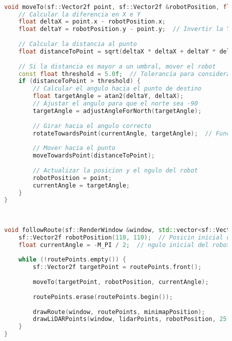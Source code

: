 \begin{lstlisting}[language={C++}, caption={Primer ajuste de c\'odigo}, label={Script}]
        
        
        
        void moveTo(sf::Vector2f point, sf::Vector2f &robotPosition, float &currentAngle) {
            // Calcular la diferencia en X e Y
            float deltaX = point.x - robotPosition.x;
            float deltaY = robotPosition.y - point.y;  // Invertir la Y para la pantalla
        
            // Calcular la distancia al punto
            float distanceToPoint = sqrt(deltaX * deltaX + deltaY * deltaY);
        
            // Si la distancia es mayor a un umbral, mover el robot
            const float threshold = 5.0f;  // Tolerancia para considerar que el punto ha sido alcanzado
            if (distanceToPoint > threshold) {
                // Calcular el angulo hacia el punto de destino
                float targetAngle = atan2(deltaY, deltaX);
                // Ajustar el angulo para que el norte sea -90
                targetAngle = adjustAngleForNorth(targetAngle);
        
                // Girar hacia el angulo correcto
                rotateTowardsPoint(currentAngle, targetAngle);  // Funcin para girar hacia el ngulo
        
                // Mover hacia el punto
                moveTowardsPoint(distanceToPoint);
                
                // Actualizar la posicion y el ngulo del robot
                robotPosition = point;
                currentAngle = targetAngle;
            }
        }
        
        
        
        void followRoute(sf::RenderWindow &window, std::vector<sf::Vector2f> &routePoints, const LaserScan &lidarPoints, const sf::Vector2f &minimapPosition, float max_range) {
            sf::Vector2f robotPosition(110, 110);  // Posicin inicial del robot en el minimapa
            float currentAngle = -M_PI / 2;  // ngulo inicial del robot (norte en -90)
        
            while (!routePoints.empty()) {
                sf::Vector2f targetPoint = routePoints.front();
        
                moveTo(targetPoint, robotPosition, currentAngle);
        
                routePoints.erase(routePoints.begin());
        
                drawRoute(window, routePoints, minimapPosition);
                drawLiDARPoints(window, lidarPoints, robotPosition, 25.0f, max_range);
            }
        }
        

\end{lstlisting}
